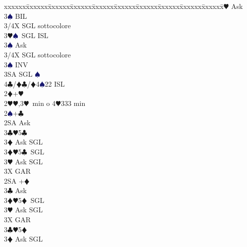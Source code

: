 \documentclass[a4paper,italian]{article}
\newcommand{\BC}{\textcolor{OliveGreen}{$\clubsuit$}}
\newcommand{\BD}{\textcolor{RedOrange}{$\vardiamondsuit$}}
\newcommand{\BH}{\textcolor{Red2}{$\varheartsuit${}}}
\newcommand{\BS}{\textcolor{MidnightBlue}{$\spadesuit${}}}
\newenvironment{bidtable}
{\begin{tabbing}

    xxxxxx\=xxxxxx\=xxxxxx\=xxxxxx\=xxxxxx\=xxxxxx\=xxxxxx\=xxxxxx\=xxxxxx\=xxxxxx\=\kill}
{\end{tabbing} }%
\begin{document}
\begin{multicols}{2}
\begin{bidtable}
                                            3\BH \> Ask\+\\
                                            3\BS \> BIL\\
                                            3/4X \> SGL sottocolore\-\-\\
                                            3\BH {}\BS\ SGL ISL\+\\
                                            3\BS \> Ask\+\\
                                            3/4X \> SGL sottocolore\-\-\\
                                            3\BS \> INV\\
                                            3SA \> SGL \BS \\
                                            4\BC/\BD {}\BC /\BD 4\BS 22 ISL\-\-\\
                                            2\BD {}+\BH \+\\
                                            2\BH {}\BH ,3\BH\ min o 4\BH 333 min\+\\
                                            2\BS {}+\BC \+\\
                                            2SA \> Ask\+\\
                                            3\BC {}\BH 5\BC \+\\
                                            3\BD \> Ask SGL\-\\
                                            3\BD {}\BH 5\BC\ SGL\+\\
                                            3\BH \> Ask SGL\-\\
                                            3X \> GAR\-\-\\
                                            2SA +\BD \+\\
                                            3\BC \> Ask\+\\
                                            3\BD {}\BH 5\BD\ SGL\+\\
                                            3\BH \> Ask SGL\-\\
                                            3X \> GAR\-\-\\
                                            3\BC {}\BH 5\BD \+\\
                                            3\BD \> Ask SGL\-\\

\end{bidtable}
\end{multicols}
\end{document}
